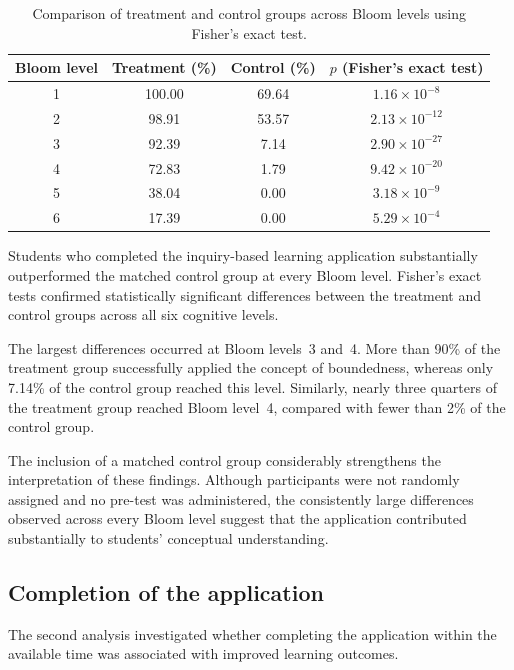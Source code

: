\documentclass[11pt]{article}
\begin{document}
\begin{table}[ht]
\centering
\caption{Comparison of treatment and control groups across Bloom levels using Fisher's exact test.}
\label{tab:fisher}
\begin{tabular}{cccc}
\toprule
\textbf{Bloom level} & \textbf{Treatment (\%)} & \textbf{Control (\%)} & \textbf{$p$ (Fisher's exact test)} \\
\midrule
1 & 100.00 & 69.64 & $1.16 \times 10^{-8}$ \\
2 & 98.91 & 53.57 & $2.13 \times 10^{-12}$ \\
3 & 92.39 & 7.14 & $2.90 \times 10^{-27}$ \\
4 & 72.83 & 1.79 & $9.42 \times 10^{-20}$ \\
5 & 38.04 & 0.00 & $3.18 \times 10^{-9}$ \\
6 & 17.39 & 0.00 & $5.29 \times 10^{-4}$ \\
\bottomrule
\end{tabular}
\end{table}
Students who completed the inquiry-based learning application substantially outperformed the matched control group at every Bloom level. Fisher's exact tests confirmed statistically significant differences between the treatment and control groups across all six cognitive levels.

The largest differences occurred at Bloom levels~3 and~4. More than 90\% of the treatment group successfully applied the concept of boundedness, whereas only 7.14\% of the control group reached this level. Similarly, nearly three quarters of the treatment group reached Bloom level~4, compared with fewer than 2\% of the control group.

The inclusion of a matched control group considerably strengthens the interpretation of these findings. Although participants were not randomly assigned and no pre-test was administered, the consistently large differences observed across every Bloom level suggest that the application contributed substantially to students' conceptual understanding.


\subsection{Completion of the application}

The second analysis investigated whether completing the application within the available time was associated with improved learning outcomes.
\end{document}
